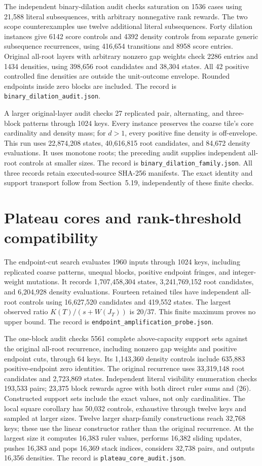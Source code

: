 \documentclass[11pt]{article}
\begin{document}
The independent binary-dilation audit checks saturation on 1536 cases
using 21,588 literal subsequences, with arbitrary nonnegative rank rewards.
The two scope counterexamples use twelve additional literal subsequences.
Forty dilation instances give 6142 score controls and 4392 density controls
from separate generic subsequence recurrences, using 416,654 transitions
and 8958 score entries. Original all-root layers with arbitrary nonzero
gap weights check 2286 entries and 1434 densities, using 398,656 root
candidates and 38,304 states. All 42 positive controlled fine densities
are outside the unit-outcome envelope. Rounded endpoints inside zero
blocks are included. The record is \texttt{binary\_dilation\_audit.json}.

A larger original-layer audit checks 27 replicated pair, alternating,
and three-block patterns through 1024 keys. Every instance preserves
the coarse tile's core cardinality and density mass; for $d>1$, every
positive fine density is off-envelope. This run uses 22,874,208 states,
40,616,815 root candidates, and 84,672 density evaluations. It uses
monotone roots; the preceding audit supplies independent all-root controls
at smaller sizes. The record is \texttt{binary\_dilation\_family.json}.
All three records retain executed-source SHA-256 manifests. The exact
identity and support transport follow from Section~5.19,
independently of these finite checks.


\section{Plateau cores and rank-threshold compatibility}
\label{app:plateau-core}
The endpoint-cut search evaluates 1960 inputs through 1024 keys, including
replicated coarse patterns, unequal blocks, positive endpoint fringes,
and integer-weight mutations. It records 1,707,458,304 states,
3,241,769,152 root candidates, and 6,204,928 density evaluations.
Fourteen retained tiles have independent all-root controls using
16,627,520 candidates and 419,552 states. The largest observed ratio
$K(T)/(s+W(J_T))$ is $20/37$. This finite maximum proves no upper
bound. The record is \texttt{endpoint\_amplification\_probe.json}.

The one-block audit checks 5561 complete above-capacity support sets
against the original all-root recurrence, including nonzero gap weights
and positive endpoint cuts, through 64 keys. Its 1,143,360 density
controls include 635,883 positive-endpoint zero identities. The original
recurrence uses 33,319,148 root candidates and 2,723,869 states.
Independent literal visibility enumeration checks 193,533 pairs;
23,375 block rewards agree with both direct ruler sums and
(26). Constructed support sets include the exact
values, not only cardinalities. The local square corollary has 50,032
controls, exhaustive through twelve keys and sampled at larger sizes.
Twelve larger sharp-family constructions
reach 32,768 keys; these use the linear constructor rather than the
original recurrence. At the largest size it computes 16,383 ruler values,
performs 16,382 sliding updates, pushes 16,383 and pops 16,369 stack
indices, considers 32,738 pairs, and outputs 16,356 densities.
The record is \texttt{plateau\_core\_audit.json}.
\end{document}
